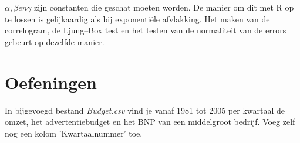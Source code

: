 $\alpha, \beta en \gamma$ zijn constanten die geschat moeten worden. 
De manier om dit met R op te lossen is gelijkaardig als bij exponentiële afvlakking. Het maken van de correlogram, de Ljung–Box test en het testen van de normaliteit van de errors gebeurt op dezelfde manier. 

\section{Oefeningen}
\label{sec:tijdreeksen-oefeningen}

\begin{exercise}
In bijgevoegd bestand \emph{Budget.csv} vind je vanaf 1981 tot 2005 per kwartaal de omzet, het advertentiebudget en het BNP van een middelgroot bedrijf. Voeg zelf nog een kolom 'Kwartaalnummer' toe.


\end{exercise}
